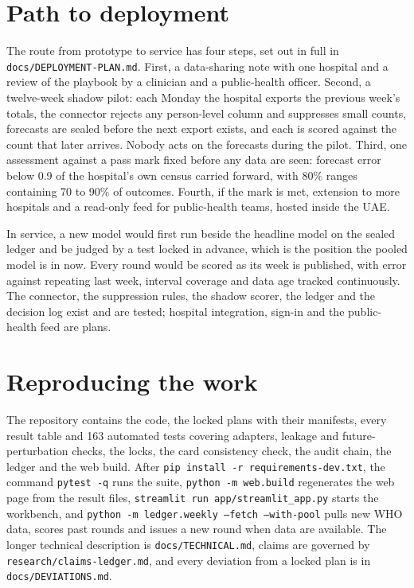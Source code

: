 \documentclass[11pt,a4paper]{article}
\begin{document}
\section{Path to deployment}

The route from prototype to service has four steps, set out in full in \texttt{docs/DEPLOYMENT-PLAN.md}. First, a data-sharing note with one hospital and a review of the playbook by a clinician and a public-health officer. Second, a twelve-week shadow pilot: each Monday the hospital exports the previous week's totals, the connector rejects any person-level column and suppresses small counts, forecasts are sealed before the next export exists, and each is scored against the count that later arrives. Nobody acts on the forecasts during the pilot. Third, one assessment against a pass mark fixed before any data are seen: forecast error below 0.9 of the hospital's own census carried forward, with 80\% ranges containing 70 to 90\% of outcomes. Fourth, if the mark is met, extension to more hospitals and a read-only feed for public-health teams, hosted inside the UAE.

In service, a new model would first run beside the headline model on the sealed ledger and be judged by a test locked in advance, which is the position the pooled model is in now. Every round would be scored as its week is published, with error against repeating last week, interval coverage and data age tracked continuously. The connector, the suppression rules, the shadow scorer, the ledger and the decision log exist and are tested; hospital integration, sign-in and the public-health feed are plans.

\section{Reproducing the work}

The repository contains the code, the locked plans with their manifests, every result table and 163 automated tests covering adapters, leakage and future-perturbation checks, the locks, the card consistency check, the audit chain, the ledger and the web build. After \texttt{pip install -r requirements-dev.txt}, the command \texttt{pytest -q} runs the suite, \texttt{python -m web.build} regenerates the web page from the result files, \texttt{streamlit run app/streamlit\_app.py} starts the workbench, and \texttt{python -m ledger.weekly --fetch --with-pool} pulls new WHO data, scores past rounds and issues a new round when data are available. The longer technical description is \texttt{docs/TECHNICAL.md}, claims are governed by \texttt{research/claims-ledger.md}, and every deviation from a locked plan is in \texttt{docs/DEVIATIONS.md}.
\end{document}
